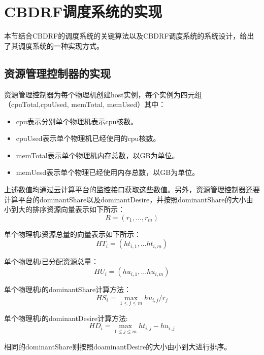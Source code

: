 \section{CBDRF调度系统的实现}
本节结合CBDRF的调度系统的关键算法以及CBDRF调度系统的系统设计，给出了其调度系统的一种实现方式。
\subsection{资源管理控制器的实现}
资源管理控制器为每个物理机创建host实例，每个实例为四元组（cpuTotal,cpuUsed, memTotal, memUsed）其中：
\begin{itemize}
\item cpu表示分别单个物理机表示cpu核数。
\item cpuUsed表示单个物理机已经使用的cpu核数。
\item memTotal表示单个物理机内存总数，以GB为单位。
\item memUesd表示单个物理已经使用内存总数，以GB为单位。
\end{itemize}

上述数值均通过云计算平台的监控接口获取这些数值。另外，资源管理控制器还要计算平台的dominantShare以及dominantDesire，并按照dominantShare的大小由小到大的排序资源向量表示如下所示：
\begin{equation}
R=\left({r}_{1},…,{r}_{m}\right)
\end{equation}

单个物理机i资源总量的向量表示如下所示：
\begin{equation}
{HT}_{i}=\left({ht}_{i,1},…{ht}_{i,m} \right)
\end{equation}

单个物理机i已分配资源总量：
\begin{equation}
{HU}_{i}=\left({hu}_{i,1},…{hu}_{i,m}\right)
\end{equation}

单个物理机i的dominantShare计算方法：
\begin{equation}
{HS}_{i} = \max \limits_{1 \leq j \leq m} {hu}_{i,j}/{{r}_{j}} 
\end{equation}

单个物理机i的dominantDesire计算方法:
\begin{equation}
{HD}_{i}=\max \limits_{1 \leq j \leq m } {ht}_{i,j}-{hu}_{i,j} 
\end{equation}

相同的dominantShare则按照doaminantDesire的大小由小到大进行排序。
